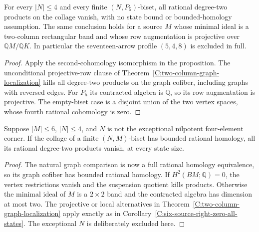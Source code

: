 \begin{corollary}
\label{C:small-opposite-P5-all-states}
For every $|N|\leq4$ and every finite $(N,P_5)$-biset,
all rational degree-two products on the collage vanish,
with no state bound or bounded-homology assumption.
The same conclusion holds for a source $M$ whose minimal
ideal is a two-column rectangular band and whose row
augmentation is projective over $\mathbb QM/\mathbb QK$.
In particular the seventeen-arrow profile $(5,4,8)$ is
excluded in full.
\end{corollary}
\begin{proof}
Apply the second-cohomology isomorphism in the proposition.
The unconditional projective-row clause of
Theorem~\ref{C:two-column-graph-localization} kills all
degree-two products on the graph cofiber, including graphs
with reversed edges.  For $P_5$ its contracted algebra is
$\mathbb Q$, so its row augmentation is projective.
The empty-biset case is a disjoint union of the two vertex
spaces, whose fourth rational cohomology is zero.
\end{proof}

\begin{corollary}
\label{C:small-opposite-six-source-regular}
Suppose $|M|\leq6$, $|N|\leq4$, and $N$ is not the
exceptional nilpotent four-element corner.  If the collage
of a finite $(N,M)$-biset has bounded rational homology,
all its rational degree-two products vanish, at every
state size.
\end{corollary}
\begin{proof}
The natural graph comparison is now a full rational
homology equivalence, so its graph cofiber has bounded
rational homology.  If $H^2(BM;\mathbb Q)=0$, the vertex
restrictions vanish and the suspension quotient kills
products.  Otherwise the minimal ideal of $M$ is a
$2\times2$ band and the contracted algebra has dimension
at most two.  The projective or local alternatives in
Theorem~\ref{C:two-column-graph-localization} apply exactly
as in Corollary~\ref{C:six-source-right-zero-all-states}.
The exceptional $N$ is deliberately excluded here.
\end{proof}

